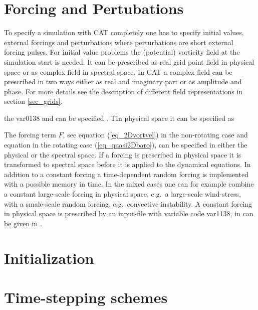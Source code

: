 \section{Forcing and Pertubations}
\label{sec_forcing}
%
To specify a simulation with CAT completely one has to specify initial 
values, external forcings and perturbations where perturbations are
short external forcing pulses. For initial value problems the (potential)
vorticity field at the simulation start is needed. It can be prescribed 
as real grid point field in physical space or as complex field in spectral 
space. In CAT a complex field can be prescribed in two ways either as real 
and imaginary part or as amplitude and phase. For more details see the 
description of different field representations in section \ref{sec_grids}.

 the var0138 and can be specified . TIn physical space it can be specified as          



The forcing term $F$, see equation (\ref{eq_2Dvortvel}) in the non-rotating
case and equation in the rotating case (\ref{eq_quasi2Dbaro}), can be 
specified in either the physical or the spectral space. If a forcing is
prescribed in physical space it is transformed to spectral space before
it is applied to the dynamical equations. In addition to a constant forcing 
a time-dependent random forcing is implemented with a possible memory in time. 
In the mixed cases one can for example combine a constant large-scale forcing 
in physical space, e.g.\ a large-scale wind-stress, with a smale-scale random 
forcing, e.g.\ convective instability. A constant forcing in physical space
is prescribed by an input-file with variable code var1138, in can be given
in .  
%    
\section{Initialization}
\label{sec_initialization}
%

%
\section{Time-stepping schemes}
\label{sec_timestepping}
%
